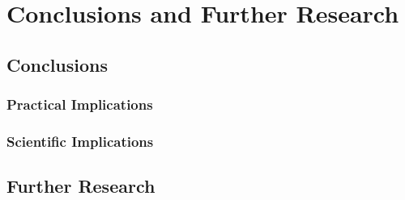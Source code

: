 \chapter{Conclusions and Further Research}

\section{Conclusions}

\subsection{Practical Implications}

\subsection{Scientific Implications}

\section{Further Research}